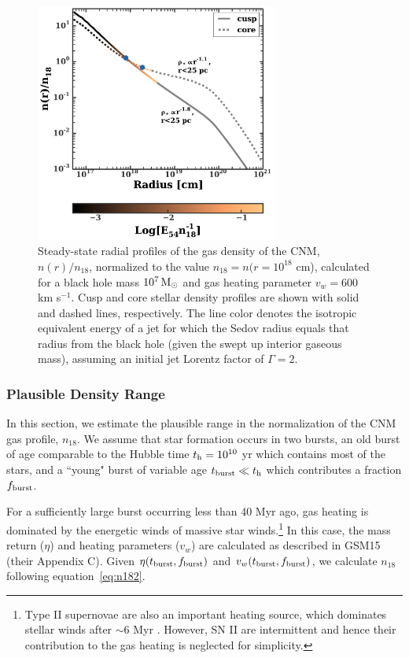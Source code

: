 \documentclass[usenatbib,fleqn]{mnras}
\newcommand{\Msun}{{\rm M_\odot}}
\begin{document}
\begin{figure}
\includegraphics[width=8cm]{sedov_radius.pdf}
\caption{\label{fig:profiles} Steady-state radial profiles of the gas density of the CNM, $n(r)/n_{18}$, normalized to the value $n_{18} = n(r = 10^{18}$ cm), calculated for a black hole mass $10^{7} \,\Msun$ and gas heating parameter $v_w=600$ km s$^{-1}$.  Cusp and core stellar density profiles are shown with solid and dashed lines, respectively.  The line color denotes the isotropic equivalent energy of a jet for which the Sedov radius equals that radius from the black hole (given the swept up interior gaseous mass), assuming an initial jet Lorentz factor of $\Gamma=2$.}
\end{figure}



\subsubsection{Plausible Density Range}
\label{sec:densAllowed}

In this section, we estimate the plausible range in the normalization of the CNM gas profile, $n_{18}$.  We assume that star formation occurs in two bursts, an old burst of age comparable to the Hubble time $t_{\rm h} = 10^{10}$ yr which contains most of the stars, and a ``young" burst of variable age $t_{\rm burst} \ll t_{\rm h}$ which contributes a fraction $f_{\rm burst}$.

For a sufficiently large burst occurring less than 40 Myr ago, gas heating is dominated by the energetic winds of massive star winds.\footnote{Type II supernovae are also an important heating source, which dominates stellar winds after $\sim$6 Myr \citep{Voss+2009}.  However, SN II are intermittent and hence their contribution to the gas heating is neglected for simplicity.}  In this case, the mass return ($\eta$) and heating
parameters ($v_w$) are calculated as described in GSM15 (their Appendix C).  Given $\eta(t_{\rm burst},f_{\rm burst})$ and $v_w(t_{\rm burst},f_{\rm burst})$, we calculate $n_{18}$ following equation~\eqref{eq:n182}.
\end{document}
